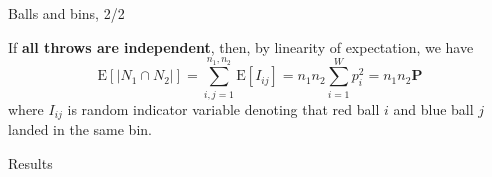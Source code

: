 \documentclass[12pt]{beamer}
\begin{document}
    \begin{frame}{Balls and bins, 2/2}
        \begin{solution}
            If \textbf{all throws are independent}, then, by linearity of expectation,
            we have
            \[
                \mathrm{E}[\vert N_1\cap N_2\vert] = \sum_{i,j=1}^{n_1,n_2}{\mathrm{E}[I_{ij}]} = n_{1}n_{2}\sum_{i=1}^{W}{p_{i}^2} = n_{1}n_{2}\mathbf{P}
            \]
            where \(I_{ij}\) is random indicator variable denoting that red ball \(i\)
            and blue ball \(j\) landed in the same bin.
        \end{solution}
    \end{frame}

    \begin{frame}{Results}
        \begin{figure}
        \end{figure}
    \end{frame}
\end{document}
